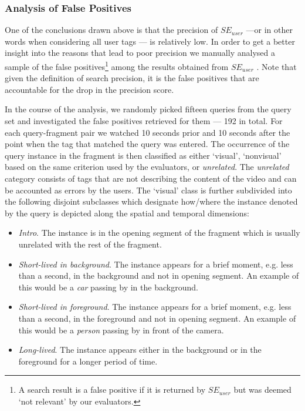 \subsubsection{Analysis of False Positives}
One of the conclusions drawn above is that the precision of $SE_{user}$ ---or in other words when considering all user tags --- is relatively low. In order to get a better insight into the reasons that lead to poor precision we manually analysed a sample of the false positives\footnote{A search result is a false positive if it is returned by $SE_{user}$ but was deemed `not relevant' by our evaluators.} among the results obtained from $SE_{user}$ . Note that given the definition of search precision, it is the false positives that are accountable for the drop in the precision score.

In the course of the analysis, we randomly picked fifteen queries from the query set and investigated the false positives retrieved for them --- 192 in total. For each query-fragment pair we watched 10 seconds prior and 10 seconds after the point when the tag that matched the query was entered. The occurrence of the query instance in the fragment is then classified as either `visual', `nonvisual' based on the same criterion used by the evaluators, or \textit{unrelated}. The \textit{unrelated} category consists of tags that are not describing the content of the video and can be accounted as errors by the users. The `visual' class is further subdivided into the following disjoint subclasses which designate how/where the instance denoted by the query is depicted along the spatial and temporal dimensions:
\begin{itemize}
\item \textit{Intro}. The instance is in the opening segment of the fragment which is usually unrelated with the rest of the fragment.
\item \textit{Short-lived in background}. The instance appears for a brief moment, e.g. less than a second, in the background and not in opening segment. An example of this would be a \textit{car} passing by in the background.
\item \textit{Short-lived in foreground}. The instance appears for a brief moment, e.g. less than a second, in the foreground and not in opening segment. An example of this  would be a \textit{person} passing by in front of the camera.
\item \textit{Long-lived}. The instance appears either in the background or in the foreground for a longer period of time.
\end{itemize}
